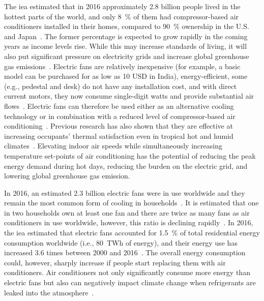 The \ac{iea} estimated that in 2016 approximately 2.8 billion people lived in the hottest parts of the world, and only 8~\% of them had compressor-based air conditioners installed in their homes, compared to 90~\% ownership in the U.S. and Japan~\cite{IEA2018}.
The former percentage is expected to grow rapidly in the coming years as income levels rise.
While this may increase standards of living, it will also put significant pressure on electricity grids and increase global greenhouse gas emissions~\cite{IEA2018}.
Electric fans are relatively inexpensive (for example, a basic model can be purchased for as low as 10 USD in India), energy-efficient, some (e.g., pedestal and desk) do not have any installation cost, and with direct current motors, they now consume single-digit watts and provide substantial air flows~\cite{Yang2015a}.
Electric fans can therefore be used either as an alternative cooling technology or in combination with a reduced level of compressor-based air conditioning~\cite{Jay2019a, Hoyt2015, Schiavon2008}.
Previous research has also shown that they are effective at increasing occupants' thermal satisfaction even in tropical hot and humid climates~\cite{Lipczynska2018a}.
Elevating indoor air speeds while simultaneously increasing temperature set-points of air conditioning has the potential of reducing the peak energy demand during hot days, reducing the burden on the electric grid, and lowering global greenhouse gas emission.

In 2016, an estimated 2.3 billion electric fans were in use worldwide and they remain the most common form of cooling in households~\cite{IEA2018}.
It is estimated that one in two households own at least one fan and there are twice as many fans as air conditioners in use worldwide, however, this ratio is declining rapidly~\cite{IEA2018}.
In 2016, the \ac{iea} estimated that electric fans accounted for 1.5~\% of total residential energy consumption worldwide (i.e., 80~TWh of energy), and their energy use has increased 3.6 times between 2000 and 2016~\cite{IEA2018}.
The overall energy consumption could, however, sharply increase if people start replacing them with air conditioners.
Air conditioners not only significantly consume more energy than electric fans but also can negatively impact climate change when refrigerants are leaked into the atmosphere~\cite{IEA2018}.

